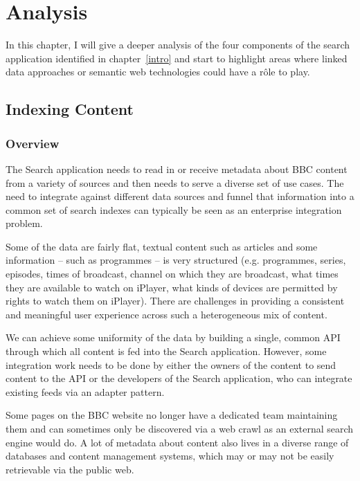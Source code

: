 \chapter{Analysis}

In this chapter, I will give a deeper analysis of the four
components of the search application identified in
chapter~\ref{intro} and start to highlight areas where linked data
approaches or semantic web technologies could have a r\^ole to play.

\section{Indexing Content}

\subsection{Overview}

The Search application needs to read in or receive metadata about
BBC content from a variety of sources and then needs to serve
a diverse set of use cases.\cite{fenning2014applicability} The
need to integrate against different data sources and funnel
that information into a common set of search indexes can
typically be seen as an enterprise integration
problem.

Some of the data are fairly flat, textual content such as articles and some
information -- such as programmes -- is very structured (e.g. programmes,
series, episodes, times of broadcast, channel on which they are broadcast,
what times they are available to watch on iPlayer, what kinds of devices
are permitted by rights to watch them on iPlayer). There are challenges
in providing a consistent and meaningful user experience across such
a heterogeneous mix of content.

We can achieve some uniformity of the data by building a single, common
API through which all content is fed into the Search application. However,
some integration work needs to be
done by either the owners of the content to send content to the API
or the developers of the Search application, who can integrate
existing feeds via an adapter pattern.

Some pages on the BBC website no
longer have a dedicated team maintaining them and can sometimes only
be discovered via a web crawl as an external search engine would do. A lot
of metadata about content also lives in a diverse range of databases and
content management systems, which may or may not be easily retrievable
via the public web.

